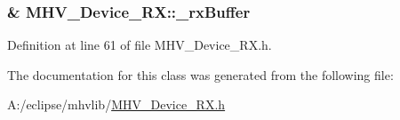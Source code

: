 \hypertarget{class_m_h_v___device___r_x_a868bacb2136afc4d3dad8d06f93847da}{
\subsubsection[{\-\_\-rx\-Buffer}]{\& M\-H\-V\-\_\-\-Device\-\_\-\-R\-X\-::\-\_\-rx\-Buffer\hspace{0.3cm}{\ttfamily [protected]}}}\label{class_m_h_v___device___r_x_a868bacb2136afc4d3dad8d06f93847da}


Definition at line 61 of file M\-H\-V\-\_\-\-Device\-\_\-\-R\-X.\-h.



The documentation for this class was generated from the following file\-:\begin{DoxyCompactItemize}
\item 
A\-:/eclipse/mhvlib/\hyperlink{_m_h_v___device___r_x_8h}{M\-H\-V\-\_\-\-Device\-\_\-\-R\-X.\-h}\end{DoxyCompactItemize}
